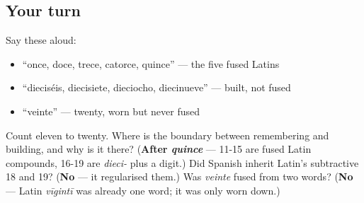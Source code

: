 \subsection*{Your turn}
Say these aloud:

\begin{itemize}
\raggedright
  \item \textquotedblleft{}once, doce, trece, catorce, quince\textquotedblright{} — the five fused Latins
  \item \textquotedblleft{}dieciséis, diecisiete, dieciocho, diecinueve\textquotedblright{} — built, not fused
  \item \textquotedblleft{}veinte\textquotedblright{} — twenty, worn but never fused
\end{itemize}

\begin{tcolorbox}[breakable,colback=teal!4,colframe=teal!35!black,title={Before you move on}]
Count eleven to twenty. Where is the boundary between remembering and building, and why is it there? (\textbf{After \emph{quince}} — 11-15 are fused Latin compounds, 16-19 are \emph{dieci-} plus a digit.) Did Spanish inherit Latin's subtractive 18 and 19? (\textbf{No} — it regularised them.) Was \emph{veinte} fused from two words? (\textbf{No} — Latin \emph{vīgintī} was already one word; it was only worn down.)
\end{tcolorbox}
